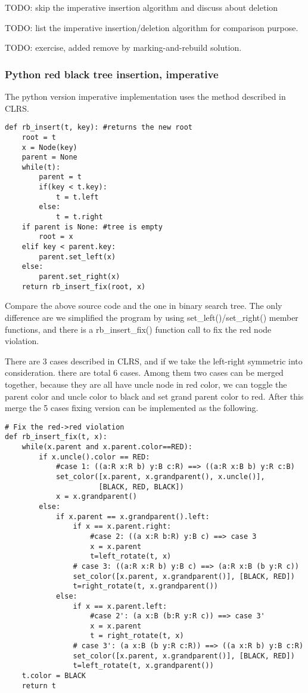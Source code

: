 \documentclass{article}
\begin{document}
TODO: skip the imperative insertion algorithm and discuss about deletion

TODO: list the imperative insertion/deletion algorithm for comparison purpose.

TODO: exercise, added remove by marking-and-rebuild solution.

\subsubsection*{Python red black tree insertion, imperative}

The python version imperative implementation uses the method described in CLRS.

\lstset{language=Python}
\begin{lstlisting}
def rb_insert(t, key): #returns the new root
    root = t
    x = Node(key)
    parent = None
    while(t):
        parent = t
        if(key < t.key):
            t = t.left
        else:
            t = t.right
    if parent is None: #tree is empty
        root = x
    elif key < parent.key:
        parent.set_left(x)
    else:
        parent.set_right(x)
    return rb_insert_fix(root, x)
\end{lstlisting}

Compare the above source code and the one in binary search tree\cite{bst-lxy}. The only difference are we simplified the program by using set\_left()/set\_right() member functions, and there is a rb\_insert\_fix() function call to fix the red node violation.

There are 3 cases described in CLRS, and if we take the left-right symmetric into consideration. there are total 6 cases. Among them two cases can be merged together, because they are all have uncle node in red color, we can toggle the parent color and uncle color to black and set grand parent color to red. After this merge the 5 cases fixing version can be implemented as the following.

\begin{lstlisting}
# Fix the red->red violation
def rb_insert_fix(t, x):
    while(x.parent and x.parent.color==RED):
        if x.uncle().color == RED:
            #case 1: ((a:R x:R b) y:B c:R) ==> ((a:R x:B b) y:R c:B)
            set_color([x.parent, x.grandparent(), x.uncle()],
                      [BLACK, RED, BLACK])
            x = x.grandparent()
        else:
            if x.parent == x.grandparent().left:
                if x == x.parent.right:
                    #case 2: ((a x:R b:R) y:B c) ==> case 3
                    x = x.parent
                    t=left_rotate(t, x)
                # case 3: ((a:R x:R b) y:B c) ==> (a:R x:B (b y:R c))
                set_color([x.parent, x.grandparent()], [BLACK, RED])
                t=right_rotate(t, x.grandparent())
            else:
                if x == x.parent.left:
                    #case 2': (a x:B (b:R y:R c)) ==> case 3'
                    x = x.parent
                    t = right_rotate(t, x)
                # case 3': (a x:B (b y:R c:R)) ==> ((a x:R b) y:B c:R)
                set_color([x.parent, x.grandparent()], [BLACK, RED])
                t=left_rotate(t, x.grandparent())
    t.color = BLACK
    return t
\end{lstlisting}
\end{document}
